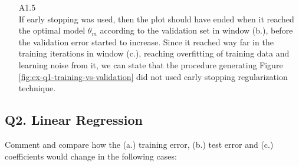 \documentclass[unicode, 11pt, a4paper]{scrartcl}
\begin{document}
\begin{itemize}
	\item[A1.5] ~\\
	      If early stopping was used, then the plot should have ended when it reached the optimal model
	      $\theta_m$ according to the validation set in window (b.),
	      before the validation error started to increase.
	      Since it reached way far in the training iterations in window (c.),
	      reaching overfitting of training data and learning noise from it,
	      we can state that the procedure generating Figure \ref{fig:ex-q1-training-vs-validation}
	      did not used early stopping regularization technique.
\end{itemize}

\subsection*{Q2. Linear Regression}
Comment and compare how the (a.) training error, (b.) test error and (c.) coefficients
would change in the following cases:
\end{document}
